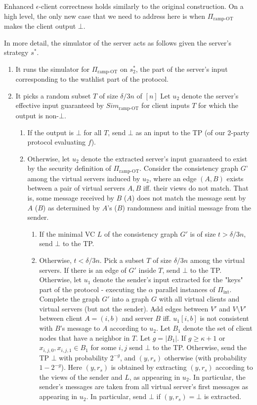 \documentclass{llncs}
\newcommand{\INT}{\Pi_{\operatorname{int}}}
\begin{document}
Enhanced $\epsilon$-client correctness holds similarly to the original construction. On a high level, the only new case that we need to address here is when $\Pi_{\text{ramp-OT}}$ makes the client output $\bot$.

In more detail, the simulator of the server acts as follows given the server's strategy $s^*$.
\begin{enumerate}
	\item It runs the simulator for $\Pi_{\text{ramp-OT}}$ on $s^*_2$, the part of the server's input corresponding to the wathlist part of the protocol.
	\item It picks a random  subset $T$ of size $\delta/3 n$ of $[n]$ Let $u_2$ denote the server's effective input guaranteed by $Sim_{\text{ramp-OT}}$ for client inputs $T$ for which the output is non-$\bot$. 
	\begin{enumerate}
	\item If the output is $\bot$ for all $T$, send $\bot$ as an input to the TP (of our 2-party protocol evaluating $f$).
	\item Otherwise, let $u_2$ denote the extracted server's input guaranteed to exist by the security definition of $\Pi_{\text{ramp-OT}}$.
	Consider the consistency graph $G$' among the virtual servers induced by $u_2$, where an edge $(A,B)$ exists between a pair of virtual servers $A,B$ iff. their views do not match. That is, some message received by $B$ ($A$) does not match the message sent by $A$ ($B$) as determined by $A$'s ($B$) randomness and initial message from the sender.
	\begin{enumerate}
		\item If the minimal VC $L$ of the consistency graph $G'$ is of size $t>\delta/3 n$, send $\bot$ to the TP.
		\item Otherwise, $t<\delta/3 n$. Pick a subset $T$ of size $\delta/3 n$ among the virtual servers. If there is an edge of $G'$ inside $T$, send $\bot$ to the TP. Otherwise, let $u_1$ denote the sender's input extracted for the "keys" part of the protocol - executing the $\alpha$ parallel instances of $\INT$. 
		Complete the graph $G'$ into a graph $G$ with all virtual clients and virtual servers (but not the sender). Add edges between $V'$ and $V\setminus{V'}$ between client $A=(i,b)$ and server $B$ iff. $u_1[i,b]$ is not consistent with $B$'s message to $A$ according to $u_2$. 
		Let $B_1$ denote the set of client nodes that have a neighbor in $T$. Let $g=|B_1|$. If $g\geq \kappa+1$ or $x_{i,j,0},x_{i,j,1}\in B_1$ for some $i,j$ send $\bot$ to the TP. Otherwise, send the TP $\bot$ with probability $2^{-g}$, and $(y,r_s)$ otherwise (with probability $1-2^{-g}$). Here $(y,r_s)$ is obtained by extracting $(y,r_s)$ according to the views of the sender and $L$, as appearing in $u_2$. In particular, the sender's messages are taken from all virtual server's first messages as appearing in $u_2$. In particular, send $\bot$ if $(y,r_s)=\bot$ is extracted.

\end{enumerate}
\end{enumerate}
\end{enumerate}
\end{document}
